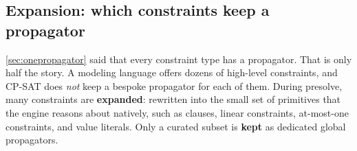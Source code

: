 \subsection{Expansion: which constraints keep a propagator}\label{sec:expansion}

\cref{sec:onepropagator} said that every constraint type has a
propagator. That is only half the story. A modeling language offers dozens of
high-level constraints, and CP-SAT does \emph{not} keep a bespoke propagator for
each of them. During presolve, many constraints are \textbf{expanded}: rewritten
into the small set of primitives that the engine reasons about natively, such
as clauses, linear constraints, at-most-one constraints, and value literals.
Only a curated subset is \textbf{kept} as dedicated global propagators.

